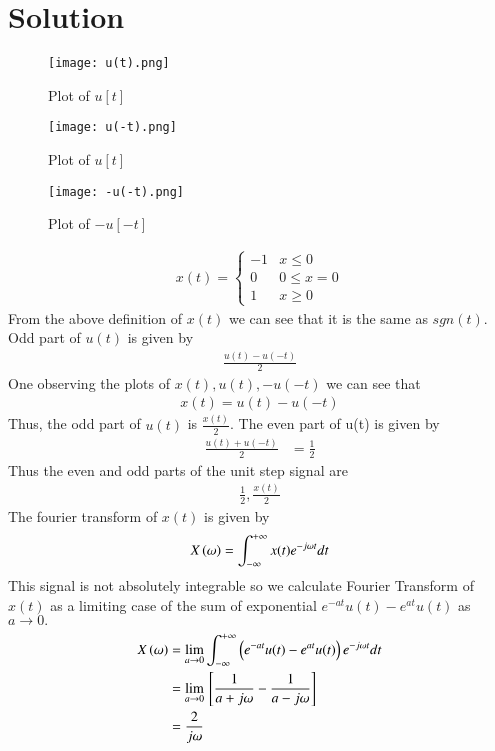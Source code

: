 \documentclass[journal,12pt,twocolumn]{IEEEtran}
\begin{document}
\section{Solution}
\begin{figure}[!ht]
         \centering
         \texttt{[image: u(t).png]}
         \caption{Plot of $u[t]$}
         \label{plot}
\end{figure}
\begin{figure}[!ht]
         \centering
         \texttt{[image: u(-t).png]}
         \caption{Plot of $u[t]$}
         \label{plot}
\end{figure}
\begin{figure}[!ht]
         \centering
         \texttt{[image: -u(-t).png]}
         \caption{Plot of $-u[-t]$}
         \label{plot}
\end{figure}
\begin{align} x(t)=\begin{cases} 
      -1 & x\leq 0 \\
      0 & 0\leq x=0 \\
      1 & x\geq 0
   \end{cases}
\end{align}
From the above definition of $x(t)$ we can see that it is the same as $sgn(t)$.
Odd part of $u(t)$ is given by
\begin{align}
    \frac{u(t)-u(-t)}{2}
\end{align}
One observing the plots of $x(t),u(t),-u(-t)$ we can see that
\begin{align}
    x(t)=u(t)-u(-t)
\end{align}
Thus, the odd part of $u(t)$ is $\frac{x(t)}{2}$.
The even part of u(t) is given by
\begin{align}
 \frac{u(t)+u(-t)}{2} &=\frac{1}{2}  
\end{align}
Thus the even and odd parts of the unit step signal are
\begin{align}
   \frac{1}{2} , \frac{x(t)}{2}
\end{align}
The fourier transform of $x(t)$ is given by
\begin{align}
    X\left(\omega\right) = \int_{ - \infty }^{ + \infty } x(t){e^{ - j\omega t}}dt
\end{align}
This signal is not absolutely integrable so we calculate Fourier Transform of $x(t)$ as a limiting case of the sum of exponential $e^{-at}u(t) - e^{at}u(t)$ as $a \to 0.$
\begin{align}
    X\left(\omega\right) &=\lim_{a \to 0} \int_{ - \infty }^{ + \infty } \left(e^{-at}u(t) - e^{at}u(t)\right){e^{ - j\omega t}}dt\\
    &=\lim_{a \to 0}{}\left[\frac{1}{a  +  j\omega}  -  \frac{1}{a  -  j\omega}\right]\\
    &=\frac{2}{j\omega}
\end{align}
\end{document}
